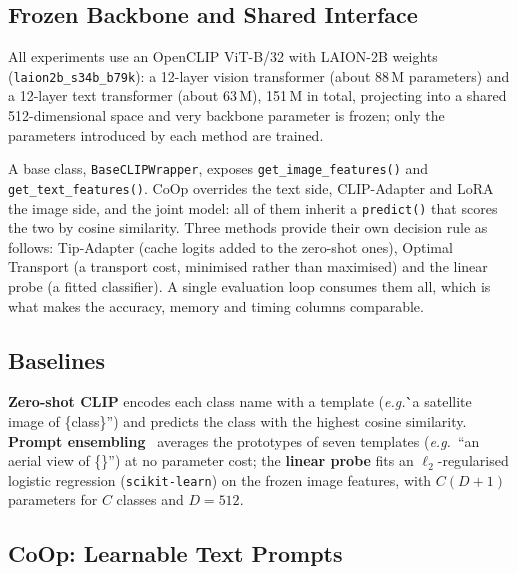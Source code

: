 \documentclass[10pt,twocolumn,letterpaper]{article}
\newcommand{\eg}{\emph{e.g.}}
\begin{document}
\subsection{Frozen Backbone and Shared Interface}\label{sec:backbone}

All experiments use an OpenCLIP ViT-B/32 with LAION-2B weights
(\texttt{laion2b\_s34b\_b79k}): a 12-layer vision transformer (about
88\,M parameters) and a 12-layer text transformer (about 63\,M), 151\,M in
total, projecting into a shared 512-dimensional space and very backbone
parameter is frozen; only the parameters introduced by each method are
trained.

A base class, \texttt{BaseCLIPWrapper}, exposes
\texttt{get\_image\_features()} and \texttt{get\_text\_features()}.  CoOp
overrides the text side, CLIP-Adapter and LoRA the image side, and the
joint model: all of them inherit a \texttt{predict()} that scores the
two by cosine similarity.  Three methods provide their own decision rule as follows: Tip-Adapter (cache logits added to the zero-shot ones), Optimal Transport (a transport cost, minimised rather than maximised) and the linear probe (a fitted classifier).  A single evaluation loop consumes them all, which is what makes the accuracy, memory and timing columns comparable.


\subsection{Baselines}\label{sec:baselines}

\textbf{Zero-shot CLIP} encodes each class name with a template (\eg\``a satellite image of \{class\}'') and predicts the class with the highest cosine similarity. \textbf{Prompt ensembling}~\cite{radford2021learning} averages the prototypes of seven
templates (\eg\ ``an aerial view of \{\}'') at no parameter cost; the \textbf{linear probe} fits an $\ell_2$-regularised logistic regression (\texttt{scikit-learn}) on the frozen image features, with $C(D+1)$ parameters for $C$ classes and $D = 512$.

\subsection{CoOp: Learnable Text Prompts}\label{sec:coop}
\end{document}
